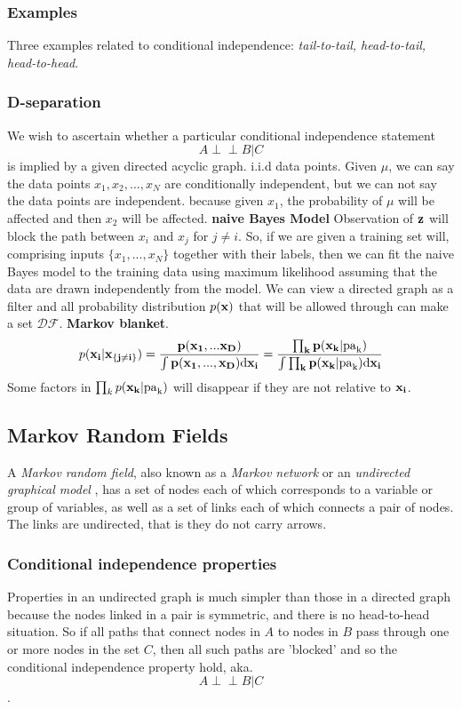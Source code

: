 \documentclass[a4paper]{book}
\def\ci{\perp\!\!\!\perp}
\begin{document}
\subsubsection{Examples}
Three examples related to conditional independence: \textit{tail-to-tail, head-to-tail, head-to-head}.
\subsubsection{D-separation}
We wish to ascertain whether a particular conditional
independence statement$$A\ci B |C$$is implied by a given directed acyclic graph.
\newline
i.i.d data points. Given $\mu$, we can say the data points $x_1,x_2,...,x_N$ are conditionally independent, but we can not say the data points are independent. because given $x_1$, the probability of $\mu$ will be affected and then $x_2$ will be affected.
\newline
\textbf{naive Bayes Model} Observation of $\bf{z}$ will block the path between $x_i$ and $x_j$ for $j\neq i$. So, if we are given a training set will, comprising inputs $\{x_1,...,x_N\}$ together with their labels, then we can fit the naive Bayes model to the training data using maximum likelihood assuming that the data are drawn independently from the model.
\newline
We can view a directed graph as a filter and all probability distribution $p(\bf x)$ that will be allowed through can make a set $\mathcal {DF}$.
\newline
\textbf{Markov blanket}.
\begin{equation}\label{eq8.9}
  p(\bf{x}_i|\bf{x}_{\{j\neq i\}}) = \frac{p(\bf x_1,...\bf x_D)}{\int p(\bf x_1,...,\bf x_D)\rm d\bf x_i}=\frac{\prod_k p(\bf x_k|\rm{pa}_k)}{\int \prod_k p(\bf x_k|\rm{pa}_k)\rm{d}\bf x_i}
\end{equation}
Some factors in $\prod_k p(\bf x_k|\rm{pa}_k)$ will disappear if they are not relative to $\bf x_i$.
\subsection{Markov Random Fields}
A \textit{Markov random field}, also known as a \textit{Markov network} or an \textit{undirected graphical model} , has a set of nodes each of which corresponds to a variable or group of variables, as well as a set of links each of which connects a pair of nodes. The links are undirected, that is they do not carry arrows.
\subsubsection{Conditional independence properties}
Properties in an undirected graph is much simpler than those in a directed graph because the nodes linked in a pair is symmetric, and there is no head-to-head situation. So if all paths that connect nodes in $A$ to nodes in $B$ pass through one or more nodes in the set $C$, then all such paths are 'blocked' and so the conditional independence property hold, aka. $$A\ci B|C$$.
\end{document}
